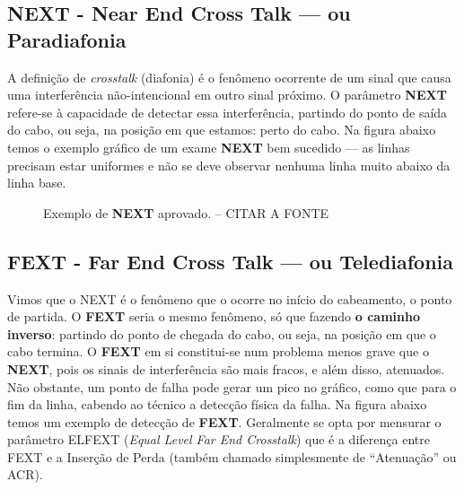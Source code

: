 \documentclass[	DIV=calc,%
							paper=a4,%
							fontsize=12pt,%
							onecolumn]{scrartcl}	 					%
\begin{document}
\subsection{NEXT - Near End Cross Talk --- ou Paradiafonia}
A definição de \textit{crosstalk} (diafonia) é o fenômeno ocorrente de um sinal que causa uma interferência não-intencional em outro sinal próximo. O parâmetro \textbf{NEXT} refere-se à capacidade de detectar essa interferência, partindo do ponto de saída do cabo, ou seja, na posição em que estamos: perto do cabo. Na figura abaixo temos o exemplo gráfico de um exame \textbf{NEXT} bem sucedido --- as linhas precisam estar uniformes e não se deve observar nenhuma linha muito abaixo da linha base.


\begin{figure}[H]
	\noindent{}
	\caption{Exemplo de \textbf{NEXT} aprovado. -- CITAR A FONTE}
	\label{fig4}
\end{figure}


\subsection{FEXT - Far End Cross Talk --- ou Telediafonia}
Vimos que o NEXT é o fenômeno que o ocorre no início do cabeamento, o ponto de partida. O \textbf{FEXT} seria o mesmo fenômeno, só que fazendo \textbf{o caminho inverso}: partindo do ponto de chegada do cabo, ou seja, na posição em que o cabo termina. O \textbf{FEXT} em si constitui-se num problema menos grave que o \textbf{NEXT}, pois os sinais de interferência são mais fracos, e além disso, atenuados. Não obstante, um ponto de falha pode gerar um pico no gráfico, como que para o fim da linha, cabendo ao técnico a detecção física da falha. Na figura abaixo temos um exemplo de detecção de \textbf{FEXT}. Geralmente se opta por mensurar o parâmetro ELFEXT (\textit{Equal Level Far End Crosstalk}) que é a diferença entre FEXT e a Inserção de Perda (também chamado simplesmente de ``Atenuação'' ou ACR).
\end{document}
